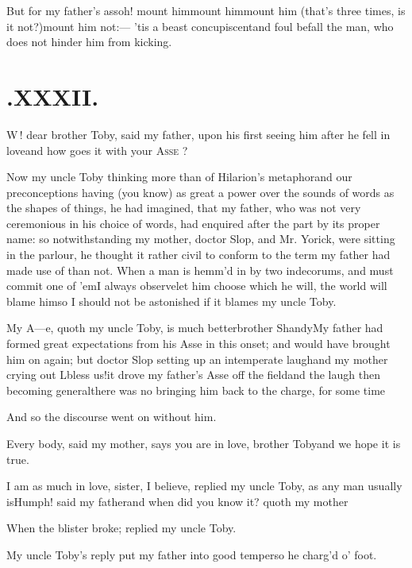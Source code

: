 \documentclass{article}
\begin{document}
\noindent
\tsh But for my father’s ass\tsh oh!
mount him\tsk mount him\tsk mount him\tsk \break
(that’s three times, is it not?)\tsk mount him not:— ’tis a beast
concupiscent\tsk and foul befall the man, who does not hinder him
from kicking.

\vfill{}\eject\null
\section{.\enspace XXXII.}

\lettrine{W}{\,}! dear brother Toby, said\break
my father, upon his first seeing him after he fell in
love\tsk and how goes it with your \textsc{Asse} ?

Now my uncle Toby thinking more 
than of Hilarion’s metaphor\tsk and our preconceptions having (you know) as great a
power over the sounds of words as the shapes of things, he had imagined, that my
father, who was not very ceremonious in his choice of words, had enquired after the
part by its proper name: so notwithstanding my mother, doctor Slop, and Mr.\@
Yorick, were sitting in the parlour, he thought it rather civil to conform to the
term my father had made use of than not. When a man is hemm’d in by two indecorums,
and must commit one of ’em\tsk I always observe\tsk\break let him choose which he will, the
world will blame him\tsk so I should not be astonished if it blames my uncle Toby.

My A—e, quoth my uncle Toby, is much
better\tsk brother Shandy\tsk My father had formed great
expectations from his Asse in this onset; and would have brought
him on again; but doctor Slop setting up an intemperate
laugh\tsk and my mother crying out L\tsk bless us!\tsk it
drove my father’s Asse off the field\tsk and the laugh then
becoming general\tsk there was no bringing him back to the
charge, for some time\tsh{}

And so the discourse went on without him.

Every body, said my mother, says\break
you are in love, brother Toby\tsk and we\break
hope it is true.

I am as much in love, sister, I believe, replied my uncle
Toby, as any man usually is\tsk Humph! said my
father\tsk\break and when did you know it? quoth my
mother\tsh

\tsh When the blister broke; replied my uncle
Toby.

My uncle Toby’s reply put my father into good
temper\tsk so he charg’d o’ foot.
\end{document}
